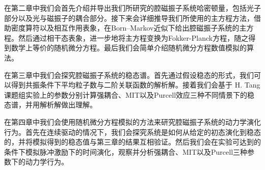 在第二章中我们会首先介绍并导出我们所研究的腔磁振子系统哈密顿量，包括光子部分以及光与磁振子的耦合部分。接下来会详细推导我们所使用的主方程方法，借助密度算符以及相互作用表象，在Born--Markov近似下给出腔磁振子系统的主方程。然后通过相干态表象，进一步地将主方程变换为Fokker-Planck方程，随之得到数学上等价的随机微分方程。最后我们会简单介绍随机微分方程数值模拟的算法。

在第三章中我们会探究腔磁振子系统的稳态谱。首先通过假设稳态的形式，我们可以得到共振条件下平均粒子数与二阶关联函数的解析解。接着我们会基于 H. Tang 课题组实验上的参数分别计算强耦合、MIT以及Purcell效应三种不同情景下的稳态谱，并用解析解做出理解。

在第四章中我们会使用随机微分方程模拟的方法来研究腔磁振子系统的动力学演化行为。首先在连续驱动的情况下，我们会探究系统是如何从给定的初态演化到稳态的，并将模拟得到的稳态值与第三章的结果互相验证。然后我们会在实验可达到的条件下模拟脉冲激励下的时间演化，观察并分析强耦合、MIT以及Purcell三种参数下的动力学行为。
